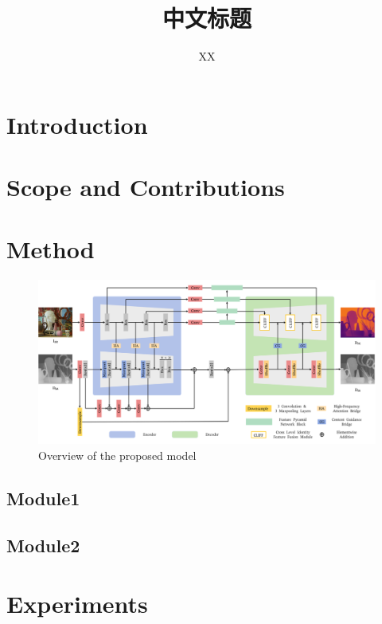 \documentclass{bjtu-report}
\title{中文标题}
\author{\textup{XX}}
\begin{document}
\makecover

\pagestyle{bjtufancy}
\setcounter{page}{1}

\section{Introduction}
\newpage


\section{Scope and Contributions}
\newpage


\section{Method}
\begin{figure}[!htbp]
	\center
	\includegraphics[scale=0.9]{mainnet.png}
	\caption{Overview of the proposed model}\label{fig:model}
\end{figure}

\subsection{Module1}

\subsection{Module2}
\newpage

\section{Experiments}
\end{document}
